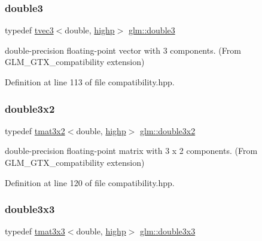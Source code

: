 \subsubsection{\texorpdfstring{double3}{double3}}
{\footnotesize\ttfamily typedef \mbox{\hyperlink{structglm_1_1tvec3}{tvec3}}$<$double, \mbox{\hyperlink{namespaceglm_a0f04f086094c747d227af4425893f545ac6f7eab42eacbb10d59a58e95e362074}{highp}}$>$ \mbox{\hyperlink{group__gtx__compatibility_ga80c4961ce61e918f21c1546d43aea2f0}{glm\+::double3}}}



double-\/precision floating-\/point vector with 3 components. (From G\+L\+M\+\_\+\+G\+T\+X\+\_\+compatibility extension) 



Definition at line 113 of file compatibility.\+hpp.

\mbox{\label{group__gtx__compatibility_ga00e4b55452fdffa224a68ead4edffa5a}} 
\subsubsection{\texorpdfstring{double3x2}{double3x2}}
{\footnotesize\ttfamily typedef \mbox{\hyperlink{structglm_1_1tmat3x2}{tmat3x2}}$<$double, \mbox{\hyperlink{namespaceglm_a0f04f086094c747d227af4425893f545ac6f7eab42eacbb10d59a58e95e362074}{highp}}$>$ \mbox{\hyperlink{group__gtx__compatibility_ga00e4b55452fdffa224a68ead4edffa5a}{glm\+::double3x2}}}



double-\/precision floating-\/point matrix with 3 x 2 components. (From G\+L\+M\+\_\+\+G\+T\+X\+\_\+compatibility extension) 



Definition at line 120 of file compatibility.\+hpp.

\mbox{\label{group__gtx__compatibility_ga3bcec888e1dca957b39c2213b740ff21}} 
\subsubsection{\texorpdfstring{double3x3}{double3x3}}
{\footnotesize\ttfamily typedef \mbox{\hyperlink{structglm_1_1tmat3x3}{tmat3x3}}$<$double, \mbox{\hyperlink{namespaceglm_a0f04f086094c747d227af4425893f545ac6f7eab42eacbb10d59a58e95e362074}{highp}}$>$ \mbox{\hyperlink{group__gtx__compatibility_ga3bcec888e1dca957b39c2213b740ff21}{glm\+::double3x3}}}



